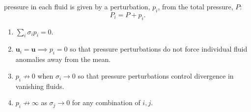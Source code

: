 \documentclass[draft]{agujournal2019}
\begin{document}
 pressure in each fluid is given by a 
perturbation, $p_{i}$, from the total pressure, $P$:
\begin{equation}
P_{i}=P+p_{i}.
\end{equation}
\begin{enumerate}
\item $\sum_{i}\sigma_{i}p_{i}=0$.
\item $\mathbf{u}_{i}=\mathbf{u} \implies p_i=0$ so that pressure perturbations do not force individual fluid anomalies away from the mean.
\item $p_i \not\to 0$ when $\sigma_i\to 0$ so that pressure perturbations control divergence in vanishing fluids.
\item $p_i\not\to\infty$ as $\sigma_j\to 0$ for any combination of $i,j$.
\end{enumerate}


  

\subsubsection{}
\end{document}
